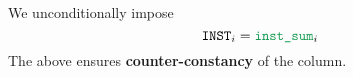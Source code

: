 We unconditionally impose
\[
	\instruction _{i} = \locInstSum  _{i}
\]
\saNote{}
The above ensures \textbf{counter-constancy} of the \instruction{} column.
